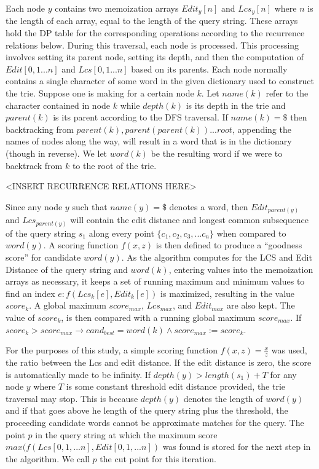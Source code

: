 \documentclass{acm_proc_article-sp}
\begin{document}
Each node $y$ contains two memoization arrays $Edit_{y}[n]$ and $Lcs_{y}[n]$ where $n$ is the length of each array, equal to the length of the query string. These arrays hold the DP table for the corresponding operations according to the recurrence relations below. During this traversal, each node is processed. This processing involves setting its parent node, setting its depth, and then the computation of $Edit[0,1. . . n]$ and $Lcs[0,1. . . n]$ based on its parents. Each node normally contains a single character of some word in the given dictionary used to construct the trie. Suppose one is making for a certain node $k$. Let $name(k)$ refer to the character contained in node $k$ while $depth(k)$ is its depth in the trie and $parent(k)$ is its parent according to the DFS traversal. If $name(k) = \$$ then backtracking from $parent(k), parent(parent(k)) . . . root$, appending the names of nodes along the way, will result in a word that is in the dictionary (though in reverse). We let $word(k)$ be the resulting word if we were to backtrack from $k$ to the root of the trie. 

<INSERT RECURRENCE RELATIONS HERE> 

Since any node $y$ such that $name(y) = \$$ denotes a word, then $Edit_{parent(y)}$ and $Lcs_{parent(y)}$ will contain the edit distance and longest common subsequence of the query string $s_1$ along every point $\{c_1,c_2,c_3, . . . c_n\}$ when compared to $word(y)$. A scoring function $f(x,z)$ is then defined to produce a ``goodness score'' for candidate $word(y)$. As the algorithm computes for the LCS and Edit Distance of the query string and $word(k)$, entering values into the memoization arrays as necessary, it keeps a set of running maximum and minimum values to find an index $e:f(Lcs_k[e],Edit_k[e])$ is maximized, resulting in the value $score_k$. A global maximum $score_{max}$, $Lcs_{max}$, and $Edit_{max}$ are also kept. The value of $score_k$, is then compared with a running global maximum $score_{max}$. If $score_k > score_{max} \rightarrow cand_{best} = word(k) \wedge score_{max} := score_k$.

For the purposes of this study, a simple scoring function $f(x,z) = \frac{x}{z}$ was used, the ratio between the Lcs and edit distance. If the edit distance is zero, the score is automatically made to be infinity. If $depth(y) > length(s_1) + T$ for any node $y$ where $T$ is some constant threshold edit distance provided, the trie traversal may stop. This is because $depth(y)$ denotes the length of $word(y)$ and if that goes above he length of the query string plus the threshold, the proceeding candidate words cannot be approximate matches for the query. The point $p$ in the query string at which the maximum score $max( f(Lcs[0,1,...n],Edit[0,1,...n])$ was found is stored for the next step in the algorithm. We call $p$ the cut point for this iteration. 
\end{document}
